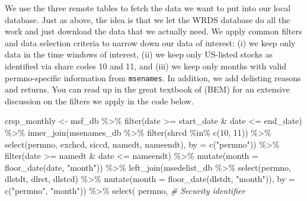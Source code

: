 \documentclass[
]{krantz}
\newenvironment{Shaded}{\begin{snugshade}}{\end{snugshade}}
\newcommand{\AttributeTok}[1]{\textcolor[rgb]{0.61,0.61,0.61}{#1}}
\newcommand{\CommentTok}[1]{\textcolor[rgb]{0.37,0.37,0.37}{\textit{#1}}}
\newcommand{\DecValTok}[1]{\textcolor[rgb]{0.06,0.06,0.06}{#1}}
\newcommand{\FunctionTok}[1]{\textcolor[rgb]{0,0,0}{#1}}
\newcommand{\NormalTok}[1]{#1}
\newcommand{\OtherTok}[1]{\textcolor[rgb]{0.37,0.37,0.37}{#1}}
\newcommand{\SpecialCharTok}[1]{\textcolor[rgb]{0,0,0}{#1}}
\newcommand{\StringTok}[1]{\textcolor[rgb]{0.5,0.5,0.5}{#1}}
\begin{document}
We use the three remote tables to fetch the data we want to put into our local database. Just as above, the idea is that we let the WRDS database do all the work and just download the data that we actually need. We apply common filters and data selection criteria to narrow down our data of interest: (i) we keep only data in the time windows of interest, (ii) we keep only US-listed stocks as identified via share codes 10 and 11, and (iii) we keep only months with valid permno-specific information from \texttt{msenames}. In addition, we add delisting reasons and returns. You can read up in the great textbook of \citep{BaliEngleMurray2016} (BEM) for an extensive discussion on the filters we apply in the code below.

\begin{Shaded}
\begin{Highlighting}[]
\NormalTok{crsp\_monthly }\OtherTok{\textless{}{-}}\NormalTok{ msf\_db }\SpecialCharTok{\%\textgreater{}\%}
  \FunctionTok{filter}\NormalTok{(date }\SpecialCharTok{\textgreater{}=}\NormalTok{ start\_date }\SpecialCharTok{\&}\NormalTok{ date }\SpecialCharTok{\textless{}=}\NormalTok{ end\_date) }\SpecialCharTok{\%\textgreater{}\%}
  \FunctionTok{inner\_join}\NormalTok{(msenames\_db }\SpecialCharTok{\%\textgreater{}\%}
    \FunctionTok{filter}\NormalTok{(shrcd }\SpecialCharTok{\%in\%} \FunctionTok{c}\NormalTok{(}\DecValTok{10}\NormalTok{, }\DecValTok{11}\NormalTok{)) }\SpecialCharTok{\%\textgreater{}\%}
    \FunctionTok{select}\NormalTok{(permno, exchcd, siccd, namedt, nameendt), }\AttributeTok{by =} \FunctionTok{c}\NormalTok{(}\StringTok{"permno"}\NormalTok{)) }\SpecialCharTok{\%\textgreater{}\%}
  \FunctionTok{filter}\NormalTok{(date }\SpecialCharTok{\textgreater{}=}\NormalTok{ namedt }\SpecialCharTok{\&}\NormalTok{ date }\SpecialCharTok{\textless{}=}\NormalTok{ nameendt) }\SpecialCharTok{\%\textgreater{}\%}
  \FunctionTok{mutate}\NormalTok{(}\AttributeTok{month =} \FunctionTok{floor\_date}\NormalTok{(date, }\StringTok{"month"}\NormalTok{)) }\SpecialCharTok{\%\textgreater{}\%}
  \FunctionTok{left\_join}\NormalTok{(msedelist\_db }\SpecialCharTok{\%\textgreater{}\%}
    \FunctionTok{select}\NormalTok{(permno, dlstdt, dlret, dlstcd) }\SpecialCharTok{\%\textgreater{}\%}
    \FunctionTok{mutate}\NormalTok{(}\AttributeTok{month =} \FunctionTok{floor\_date}\NormalTok{(dlstdt, }\StringTok{"month"}\NormalTok{)), }\AttributeTok{by =} \FunctionTok{c}\NormalTok{(}\StringTok{"permno"}\NormalTok{, }\StringTok{"month"}\NormalTok{)) }\SpecialCharTok{\%\textgreater{}\%}
  \FunctionTok{select}\NormalTok{(}
\NormalTok{    permno, }\CommentTok{\# Security identifier}

\end{Highlighting}
\end{Shaded}
\end{document}
